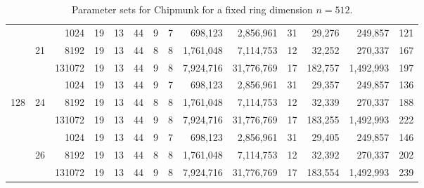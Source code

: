 \begin{table}
\begin{tabular}{ccr|cc|cccrr|crr|c}
      &       &   1024 &         19 &        13 &        44 &          9 &       7 &        698,123 &  2,856,961 &    31 &       29,276 &   249,857 & 121 \\%
      &    21 &   8192 &         19 &        13 &       44 &          8 &       8 &      1,761,048 &  7,114,753 &    12 &       32,252 &   270,337 & 167 \\%
      &       & 131072 &         19 &        13 &       44 &          9 &       8 &      7,924,716 & 31,776,769 &    17 &      182,757 & 1,492,993 & 197 \\\cline{2-14}
  
      &       &   1024 &         19 &        13 &       44 &          9 &       7 &        698,123 &  2,856,961 &    31 &       29,357 &   249,857 & 136 \\%
  128 &    24 &   8192 &         19 &        13 &       44 &          8 &       8 &      1,761,048 &  7,114,753 &    12 &       32,339 &   270,337 & 188 \\%
      &       & 131072 &         19 &        13 &       44 &          9 &       8 &      7,924,716 & 31,776,769 &    17 &      183,255 & 1,492,993 & 222 \\\cline{2-14}
  
      &       &   1024 &         19 &        13 &       44 &          9 &       7 &        698,123 &  2,856,961 &    31 &       29,405 &   249,857 & 146 \\%
      &    26 &   8192 &         19 &        13 &       44 &          8 &       8 &      1,761,048 &  7,114,753 &    12 &       32,392 &   270,337 & 202 \\%
      &       & 131072 &         19 &        13 &       44 &          9 &       8 &      7,924,716 & 31,776,769 &    17 &      183,554 & 1,492,993 & 239 \\\bottomrule
    \end{tabular}
    \caption{Parameter sets for Chipmunk for a fixed ring dimension $n=512$.}\label{tab:param}
  \end{table}
\egroup


